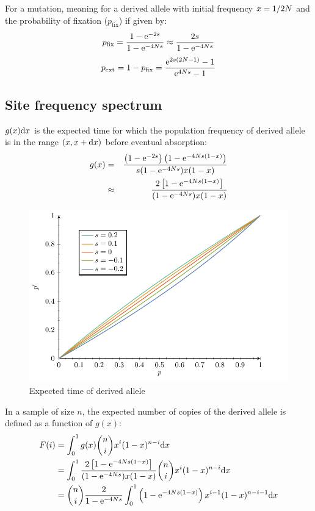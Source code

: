 For a mutation, meaning for a derived allele with initial frequency $x = 1 / 2 N$ and the probability of fixation ($p_{\mathrm{fix}}$) if given by:
\begin{align}
	p_{\mathrm{fix}} = \dfrac{1 - \mathrm{e}^{-2 s}}{1 - \mathrm{e}^{-4 N s}} \approx  \dfrac{2 s }{1 - \mathrm{e}^{-4 N s}}
\end{align}
\begin{align}
	p_{\mathrm{ext}} = 1 - p_{\mathrm{fix}} = \dfrac{ \mathrm{e}^{2s(2 N -1) } - 1 }{\mathrm{e}^{4 N s} - 1}
\end{align}

\subsection*{Site frequency spectrum}

$g(x) \mathrm{d} x $ is the expected time for which the population frequency of derived allele is in the range $(x, x+\mathrm{d} x)$ before eventual absorption:
\begin{align}
	g(x) & =  & \dfrac{\left( 1 - \mathrm{e}^{- 2 s }\right) \left( 1 - \mathrm{e}^{-4 N s(1-x)}\right)}{ s (1 - \mathrm{e}^{-4 N s})x(1-x)} \\
	& \approx  & \dfrac{2 \left[ 1 - \mathrm{e}^{-4 N s(1-x)}\right]}{(1 - \mathrm{e}^{-4 N s})x(1-x)}
\end{align}

\begin{figure}[thbp]
	\begin{center}
		\includegraphics[width=\textwidth, page=4] {figures.pdf}
	\end{center}
	\caption{Expected time of derived allele}
\end{figure}

In a sample of size $n$, the expected number of copies of the derived allele is defined as a function of $g(x)$:
\begin{align}
	F(i) & = \int_{0}^{1} g(x) \binom{n}{i} x^{i} (1-x)^{n-i} \mathrm{d} x \\
	& = \int_{0}^{1} \dfrac{2 \left[ 1 - \mathrm{e}^{-4 N s(1-x)}\right]}{(1 - \mathrm{e}^{-4 N s})x(1-x)} \binom{n}{i} x^{i} (1-x)^{n-i} \mathrm{d} x \\
	& = \binom{n}{i} \dfrac{ 2 }{1 - \mathrm{e}^{-4 N s}} \int_{0}^{1} \left( 1 - \mathrm{e}^{-4 N s(1-x)} \right) x^{i-1} (1-x)^{n-i-1} \mathrm{d} x 
\end{align}


